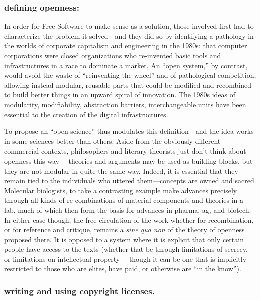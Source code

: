 \documentclass[11pt]{article}
\begin{document}
\subsubsection*{\textbf{defining openness}:}
\label{sec:orgc0e1cc1}

In order for Free Software to make sense as a solution, those involved first had to characterize the problem it solved---and they did so by identifying a pathology in the worlds of corporate capitalism and engineering in the 1980s: that computer corporations were closed organizations who re-invented basic tools and infrastructures in a race to dominate a market.    An ``open system,'' by contrast, would avoid the waste of ``reinventing the wheel'' and of pathological competition, allowing instead  modular, reusable parts that could be modified and recombined to build better things in an upward spiral of innovation.  The 1980s ideas of modularity, modifiability, abstraction barriers, interchangeable units have been essential to the creation of the digital infrastructures. 

To propose an ``open science'' thus modulates this definition---and the idea works in some sciences better than others.  Aside from the obviously different commercial contexts, philosophers and literary theorists just don't think about openness this way--- theories and arguments may be used as building blocks, but they are not modular in quite the same way.  Indeed, it is essential that they remain tied to the individuals who uttered them---concepts are owned and sacred.  Molecular biologists, to take a contrasting example make advances precisely through all kinds of re-combinations of material components and theories in a lab, much of which then form the basis for advances in pharma, ag, and biotech.    In either case though, the free circulation of the work whether for recombination, or for reference and critique, remains a \emph{sine qua non} of the theory of openness proposed there.   It is opposed to a system where it is explicit that only certain people have access to the texts (whether that be through limitations of secrecy, or limitations on intellectual property--- though it can be one that is implicitly restricted to those who are elites, have paid, or otherwise are ``in the know''). 

\subsubsection*{\textbf{writing and using copyright licenses}.}
\label{sec:org07a329d}
\end{document}
